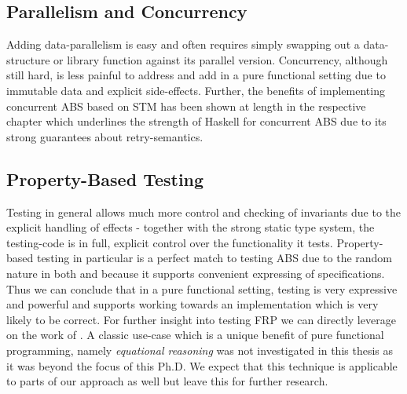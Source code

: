\subsection{Parallelism and Concurrency}
Adding data-parallelism is easy and often requires simply swapping out a data-structure or library function against its parallel version. Concurrency, although still hard, is less painful to address and add in a pure functional setting due to immutable data and explicit side-effects. Further, the benefits of implementing concurrent ABS based on STM has been shown at length in the respective chapter which underlines the strength of Haskell for concurrent ABS due to its strong guarantees about retry-semantics. 

\subsection{Property-Based Testing}
Testing in general allows much more control and checking of invariants due to the explicit handling of effects - together with the strong static type system, the testing-code is in full, explicit control over the functionality it tests. Property-based testing in particular is a perfect match to testing ABS due to the random nature in both and because it supports convenient expressing of specifications. Thus we can conclude that in a pure functional setting, testing is very expressive and powerful and supports working towards an implementation which is very likely to be correct. For further insight into testing FRP we can directly leverage on the work of \cite{perez_testing_2017}. A classic use-case which is a unique benefit of pure functional programming, namely \textit{equational reasoning} was not investigated in this thesis as it was beyond the focus of this Ph.D. We expect that this technique is applicable to parts of our approach as well but leave this for further research.


